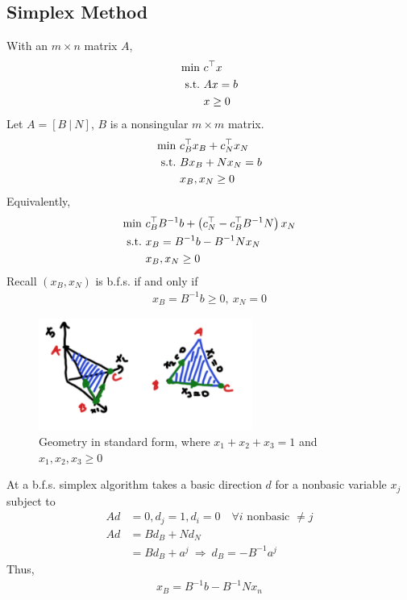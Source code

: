 \documentclass[11pt]{article}
\numberwithin{equation}{section}
\begin{document}
\subsection{Simplex Method}
With an $m \times n$ matrix $A$,
\begin{align*}
    \min \  & {c}^{\top} {x} \\
    \text{s.t.} \  & Ax=b \\ & x \geq 0 
\end{align*}
Let $A=\left[ B\ |\ N \right]$, $B$ is a nonsingular $m \times m$ matrix.
\begin{align*}
    \min \  & c_B^\top {x}_B + c_N^\top x_N \\
    \text{s.t.} \  & Bx_B + N x_N =b \\ & x_B, x_N \geq 0 
\end{align*}
Equivalently,             \begin{align*}
    \min \  & c_B^\top B^{-1}b + \left( c_N^\top - c_B^\top B^{-1}N \right) x_N \\
    \text{s.t.} \  & x_B = B^{-1}b - B^{-1}N x_N \\ & x_B, x_N \geq 0 
\end{align*}
Recall $\left( x_B, x_N \right)$ is b.f.s. if and only if \begin{align*}
    x_B = B^{-1}b \geq 0, \ x_N=0
\end{align*}

\begin{figure}[H]
    \centering
    \includegraphics[width = 7cm]{images/6-ex-6.png}
    \caption{Geometry in standard form, where $x_{1}+x_{2}+x_{3}=1$ and $x_{1}, x_{2}, x_{3} \geq 0$}
\end{figure}

At a b.f.s. simplex algorithm takes a basic direction $d$ for a nonbasic variable $x_j$ subject to \begin{align*}
    Ad &=0, d_j=1, d_{i}=0 \quad \forall i \text{ nonbasic } \neq j \\
    Ad &= Bd_B + Nd_N \\
    &= Bd_B + a^j \ \Rightarrow \ d_B = -B^{-1}a^j
\end{align*}
Thus, \begin{align*}
    x_B = B^{-1} b-B^{-1} N x_n
\end{align*}
\end{document}
